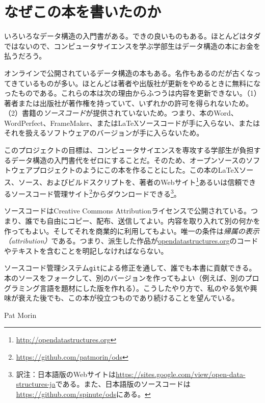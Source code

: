 \chapter*{なぜこの本を書いたのか}

いろいろなデータ構造の入門書がある。できの良いものもある。ほとんどはタダではないので、コンピュータサイエンスを学ぶ学部生はデータ構造の本にお金を払うだろう。

オンラインで公開されているデータ構造の本もある。名作もあるのだが古くなってきているものが多い。ほとんどは著者や出版社が更新をやめるときに無料になったものである。これらの本は次の理由からふつうは内容を更新できない。（1）著者または出版社が著作権を持っていて、いずれかの許可を得られないため。（2）書籍の\emph{ソースコード}が提供されていないため。つまり、本のWord、WordPerfect、FrameMaker、または\LaTeX{}ソースコードが手に入らない、またはそれを扱えるソフトウェアのバージョンが手に入らないため。

このプロジェクトの目標は、コンピュータサイエンスを専攻する学部生が負担するデータ構造の入門書代をゼロにすることだ。そのため、オープンソースのソフトウェアプロジェクトのようにこの本を作ることにした。この本の\LaTeX{}ソース、\lang{}ソース、およびビルドスクリプトを、著者のWebサイト\footnote {\url{http://opendatastructures.org}}あるいは信頼できるソースコード管理サイト\footnote {\url{https://github.com/patmorin/ods}}からダウンロードできる\footnote {訳注：日本語版のWebサイトは\url{https://sites.google.com/view/open-data-structures-ja}である。また、日本語版のソースコードは\url{https://github.com/spinute/ods}にある。}。

ソースコードはCreative Commons Attributionライセンスで公開されている。つまり、誰でも自由にコピー、配布、送信してよい。内容を取り入れて別の何かを作ってもよい。そしてそれを商業的に利用してもよい。唯一の条件は\emph{帰属の表示（attribution）}である。つまり、派生した作品が\url{opendatastructures.org}のコードやテキストを含むことを明記しなければならない。

ソースコード管理システム\texttt{git}による修正を通して、誰でも本書に貢献できる。本のソースをフォークして、別のバージョンを作ってもよい（例えば、別のプログラミング言語を題材にした版を作れる）。こうしたやり方で、私のやる気や興味が衰えた後でも、この本が役立つものであり続けることを望んでいる。

\hfill Pat Morin
